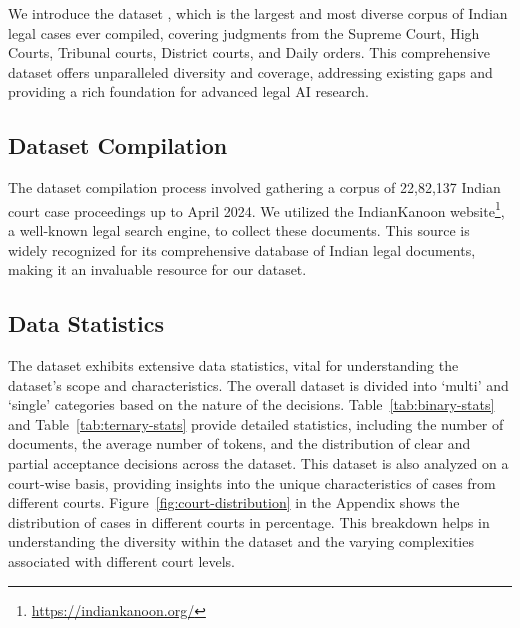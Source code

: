 We introduce the dataset \textbf{\texttt{\named}}, which is the largest and most diverse corpus of Indian legal cases ever compiled, covering judgments from the Supreme Court, High Courts, Tribunal courts, District courts, and Daily orders. This comprehensive dataset offers unparalleled diversity and coverage, addressing existing gaps and providing a rich foundation for advanced legal AI research.

\subsection{Dataset Compilation}

The dataset compilation process involved gathering a corpus of 22,82,137 Indian court case proceedings up to April 2024. We utilized the IndianKanoon website\footnote{\url{https://indiankanoon.org/}}, a well-known legal search engine, to collect these documents. This source is widely recognized for its comprehensive database of Indian legal documents, making it an invaluable resource for our dataset.

\subsection{Data Statistics} 

The \texttt{\named} dataset exhibits extensive data statistics, vital for understanding the dataset's scope and characteristics. The overall dataset is divided into `multi' and `single' categories based on the nature of the decisions. Table~\ref{tab:binary-stats} and Table~\ref{tab:ternary-stats} provide detailed statistics, including the number of documents, the average number of tokens, and the distribution of clear and partial acceptance decisions across the dataset. This dataset is also analyzed on a court-wise basis, providing insights into the unique characteristics of cases from different courts.
Figure~\ref{fig:court-distribution} in the Appendix shows the distribution of cases in different courts in percentage. This breakdown helps in understanding the diversity within the dataset and the varying complexities associated with different court levels.



